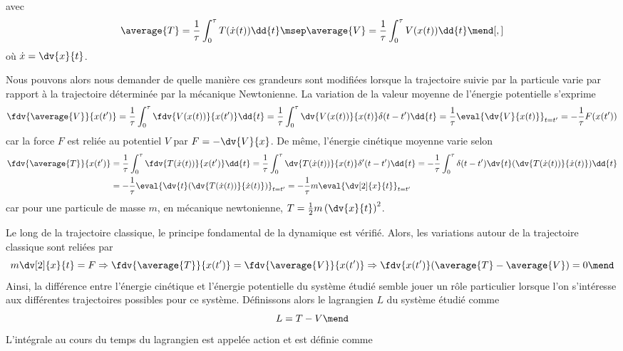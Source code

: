 avec
\begin{equation}
\average{T} = \frac{1}{\tau}\int_0^\tau T(\dot{x}(t)) \dd{t}
\msep
\average{V} = \frac{1}{\tau}\int_0^\tau V(x(t)) \dd{t}
\mend[,]
\end{equation}
où $\dot{x}=\dv{x}{t}$.
\par
Nous pouvons alors nous demander de quelle manière ces grandeurs sont modifiées lorsque la trajectoire suivie par la particule varie par rapport à la trajectoire déterminée par la mécanique Newtonienne. La variation de la valeur moyenne de l'énergie potentielle s'exprime
\begin{equation}
\fdv{\average{V}}{x(t')}
= \frac{1}{\tau}\int_0^\tau \fdv{V(x(t))}{x(t')} \dd{t}
= \frac{1}{\tau}\int_0^\tau \dv{V(x(t))}{x(t)}\delta(t-t') \dd{t}
= \frac{1}{\tau}\eval{\dv{V}{x(t)}}_{t=t'}
= -\frac{1}{\tau}F(x(t'))
\end{equation}
car la force $F$ est reliée au potentiel $V$ par $F = - \dv{V}{x}$.
De même, l'énergie cinétique moyenne varie selon
\begin{align}
\fdv{\average{T}}{x(t')}
&
= \frac{1}{\tau}\int_0^\tau \fdv{T(\dot{x}(t))}{x(t')} \dd{t}
=\frac{1}{\tau}\int_0^\tau \dv{T(\dot{x}(t))}{x(t)}\delta'(t-t') \dd{t}
=-\frac{1}{\tau}\int_0^\tau \delta(t-t') \dv{t}(\dv{T(\dot{x}(t))}{\dot{x}(t)}) \dd{t}
\nonumber
\\&
=-\frac{1}{\tau}\eval{\dv{t}(\dv{T(\dot{x}(t))}{\dot{x}(t)})}_{t=t'}
=-\frac{1}{\tau}m\eval{\dv[2]{x}{t}}_{t=t'}
\end{align}
car pour une particule de masse $m$, en mécanique newtonienne, $T = \frac{1}{2}m\left(\dv{x}{t}\right)^2$.
\par
Le long de la trajectoire classique, le principe fondamental de la dynamique est vérifié. Alors, les variations autour de la trajectoire classique sont reliées par
\begin{equation}
m\dv[2]{x}{t} = F
\Rightarrow
\fdv{\average{T}}{x(t')} = \fdv{\average{V}}{x(t')}
\Rightarrow
\fdv{x(t')}(\average{T}-\average{V}) = 0 \label{eq-fdv_x_T-V_is_0}
\mend
\end{equation}
Ainsi, la différence entre l'énergie cinétique et l'énergie potentielle du système étudié semble jouer un rôle particulier lorsque l'on s'intéresse aux différentes trajectoires possibles pour ce système. Définissons alors le lagrangien $L$ du système étudié comme
\begin{equation}
L = T-V
\mend
\end{equation}
L'intégrale au cours du temps du lagrangien est appelée action et est définie comme
